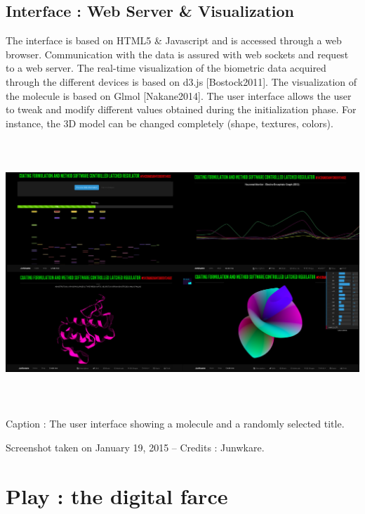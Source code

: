 \subsection[Interface : Web Server \& Visualization ]{Interface : Web
Server \& Visualization }
The interface is based on HTML5 \& Javascript and is accessed through a
web browser. Communication with the data is assured with web sockets
and request to a web server. The real-time visualization of the
biometric data acquired through the different devices is based on d3.js
[Bostock2011]. The visualization of the molecule is based on Glmol
[Nakane2014]. The user interface allows the user to tweak and modify
different values obtained during the initialization phase. For
instance, the 3D model can be changed completely (shape, textures,
colors).


\bigskip



\begin{center}
\includegraphics[width=6.9252in,height=3.9091in]{images/junkware-img3.jpg}
\end{center}
{\centering
Caption : The user interface showing a molecule and a randomly selected
title. 
\par}

{\centering
Screenshot taken on January 19, 2015 -- Credits : Junwkare.
\par}


\bigskip

\section[Play : the digital farce]{Play : the digital farce}
